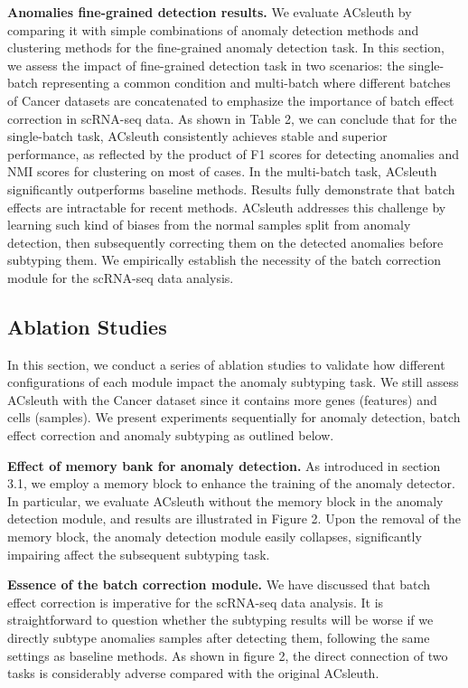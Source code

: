 \documentclass{article}
\begin{document}
\textbf{Anomalies fine-grained detection results.}	We evaluate ACsleuth by comparing it with simple combinations 
of anomaly detection methods and clustering methods for the fine-grained anomaly detection task. In 
this section, we assess the impact of fine-grained detection task in two scenarios: the 
single-batch representing a common condition and multi-batch where different batches of 
Cancer datasets are concatenated to emphasize the importance of batch effect correction 
in scRNA-seq data. As shown in Table 2, we can conclude that for the single-batch task, 
ACsleuth consistently achieves stable and superior performance, as reflected by the product 
of F1 scores for detecting anomalies and NMI scores for clustering on most of cases. In 
the multi-batch task, ACsleuth significantly outperforms baseline methods. Results fully 
demonstrate that batch effects are intractable for recent methods. ACsleuth addresses this 
challenge by learning such kind of biases from the normal samples split from anomaly 
detection, then subsequently correcting them on the detected anomalies before subtyping 
them. We empirically establish the necessity of the batch correction module for the scRNA-seq data analysis.

\subsection{Ablation Studies}
In this section, we conduct a series of ablation studies to validate how different 
configurations of each module impact the anomaly subtyping task. We still assess ACsleuth with 
the Cancer dataset since it contains more genes (features) and cells (samples). We 
present experiments sequentially for anomaly detection, batch effect correction and anomaly 
subtyping as outlined below.

\textbf{Effect of memory bank for anomaly detection.}	As introduced in section 3.1, 
we employ a memory block to enhance the training of the anomaly detector. In particular, 
we evaluate ACsleuth without the memory block in the anomaly detection module, and results are 
illustrated in Figure 2. Upon the removal of the memory block, the anomaly detection 
module easily collapses, significantly impairing affect the subsequent subtyping task.

\textbf{Essence of the batch correction module.}	We have discussed that batch effect correction 
is imperative for the scRNA-seq data analysis. It is straightforward to question whether 
the subtyping results will be worse if we directly subtype anomalies samples after 
detecting them, following the same settings as baseline methods. As shown in figure 2, 
the direct connection of two tasks is considerably adverse compared with the original ACsleuth.
\end{document}
